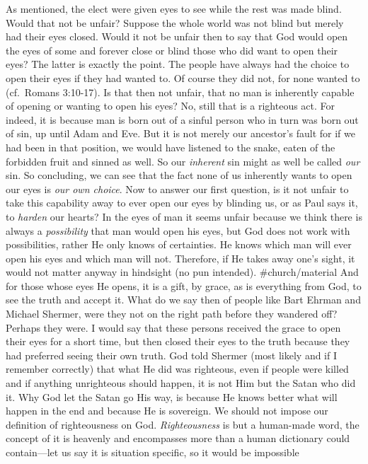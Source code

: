 As mentioned, the elect were given eyes to see while the rest was made
blind. Would that not be unfair? Suppose the whole world was not blind
but merely had their eyes closed. Would it not be unfair then to say
that God would open the eyes of some and forever close or blind those
who did want to open their eyes? The latter is exactly the point. The
people have always had the choice to open their eyes if they had wanted
to. Of course they did not, for none wanted to (cf.~Romans 3:10-17). Is
that then not unfair, that no man is inherently capable of opening or
wanting to open his eyes? No, still that is a righteous act. For indeed,
it is because man is born out of a sinful person who in turn was born
out of sin, up until Adam and Eve. But it is not merely our ancestor's
fault for if we had been in that position, we would have listened to the
snake, eaten of the forbidden fruit and sinned as well. So our
\emph{inherent} sin might as well be called \emph{our} sin. So
concluding, we can see that the fact none of us inherently wants to open
our eyes is \emph{our own choice}. Now to answer our first question, is
it not unfair to take this capability away to ever open our eyes by
blinding us, or as Paul says it, to \emph{harden} our hearts? In the
eyes of man it seems unfair because we think there is always a
\emph{possibility} that man would open his eyes, but God does not work
with possibilities, rather He only knows of certainties. He knows which
man will ever open his eyes and which man will not. Therefore, if He
takes away one's sight, it would not matter anyway in hindsight (no pun
intended). \#church/material And for those whose eyes He opens, it is a
gift, by grace, as is everything from God, to see the truth and accept
it. What do we say then of people like Bart Ehrman and Michael Shermer,
were they not on the right path before they wandered off? Perhaps they
were. I would say that these persons received the grace to open their
eyes for a short time, but then closed their eyes to the truth because
they had preferred seeing their own truth. God told Shermer (most likely
and if I remember correctly) that what He did was righteous, even if
people were killed and if anything unrighteous should happen, it is not
Him but the Satan who did it. Why God let the Satan go His way, is
because He knows better what will happen in the end and because He is
sovereign. We should not impose our definition of righteousness on God.
\emph{Righteousness} is but a human-made word, the concept of it is
heavenly and encompasses more than a human dictionary could
contain---let us say it is situation specific, so it would be impossible

